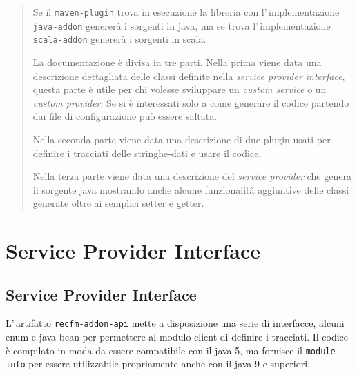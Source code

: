 \documentclass[a4paper,10pt]{report}
\newif\ifesource
\begin{document}
\begin{abstract}
Se il \verb!maven-plugin! trova in esecuzione la libreria con 
l'\,implementazione \verb!java-addon! genererà i sorgenti in java, ma se trova
l'\,implementazione \verb!scala-addon! genererà i sorgenti in scala.

La documentazione è divisa in tre parti. Nella prima viene data una descrizione
dettagliata delle classi definite nella \textsl{service provider interface},
questa parte è utile per chi volesse sviluppare un \textit{custom service} o
un \textit{custom provider}. Se si è interessati solo a come generare il
codice partendo dai file di configurazione può essere saltata.

Nella seconda parte viene data una descrizione di due plugin usati per definire
i tracciati delle stringhe-dati e usare il codice.

Nella terza parte viene data una descrizione del \textsl{service provider}
che genera il sorgente java mostrando anche alcune funzionalità aggiuntive
delle classi generate oltre ai semplici setter e getter.
\end{abstract}

%


\tableofcontents
\listoffigures
\listoftables

\ifesource
\lstlistoflistings
\else
\listoflistings
\fi

\clearpage

\part{Service Provider Interface}

%                                           

\chapter{Service Provider Interface}
L'\,artifatto \verb!recfm-addon-api! mette a disposizione una serie di 
interfacce, alcuni enum e java-bean per permettere al modulo client di definire
i tracciati. 
Il codice è compilato in moda da essere compatibile con il java 5, ma fornisce
il \verb!module-info! per essere utilizzabile propriamente anche con il java 9
e superiori.
\end{document}
